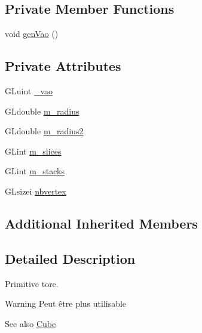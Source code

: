 \subsection*{Private Member Functions}
\begin{DoxyCompactItemize}
\item 
void \hyperlink{class_sphere_aacaf4cf9d7810dffd8c81c8c8298a95b}{gen\+Vao} ()
\end{DoxyCompactItemize}
\subsection*{Private Attributes}
\begin{DoxyCompactItemize}
\item 
G\+Luint \hyperlink{class_sphere_a18d31b1d011d5c5e452b9b9b6f54b10f}{\+\_\+vao}
\item 
G\+Ldouble \hyperlink{class_sphere_a4b019bb4bf74ac28ab56d5ae2c9ca6ea}{m\+\_\+radius}
\item 
G\+Ldouble \hyperlink{class_sphere_aa3ec1c07df539131c0fb886fe9c619fd}{m\+\_\+radius2}
\item 
G\+Lint \hyperlink{class_sphere_a6ddad99936fa616fa04862aa92e20105}{m\+\_\+slices}
\item 
G\+Lint \hyperlink{class_sphere_aef79b7beb9d008e8dcc0849fbe691072}{m\+\_\+stacks}
\item 
G\+Lsizei \hyperlink{class_sphere_a4e8e9f5ba889e700b7244bc70232a271}{nbvertex}
\end{DoxyCompactItemize}
\subsection*{Additional Inherited Members}


\subsection{Detailed Description}
Primitive tore. 

\begin{DoxyWarning}{Warning}
Peut être plus utilisable 
\end{DoxyWarning}
\begin{DoxySeeAlso}{See also}
\hyperlink{class_cube}{Cube} 
\end{DoxySeeAlso}


